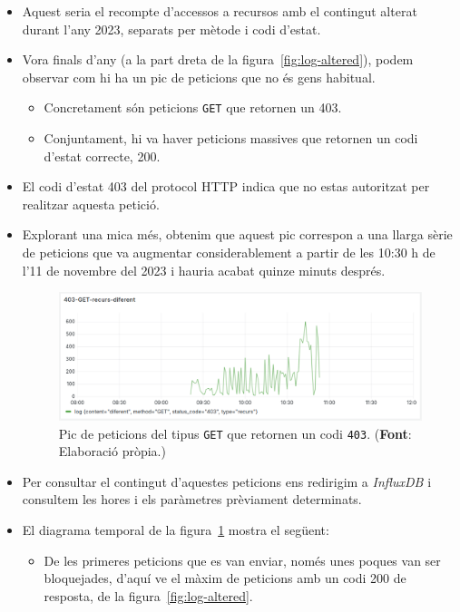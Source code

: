 \begin{itemize}
    \item Aquest seria el recompte d'accessos a recursos amb el contingut alterat durant l'any 2023, separats per mètode i codi d'estat.
    \item Vora finals d'any (a la part dreta de la figura~\ref{fig:log-altered}), podem observar com hi ha un pic de peticions que no és gens habitual.
    \begin{itemize}
        \item Concretament són peticions \texttt{GET} que retornen un 403.
        \item Conjuntament, hi va haver peticions massives que retornen un codi d'estat correcte, 200.
    \end{itemize}
    \item El codi d'estat 403 del protocol \gls{HTTP} indica que no estas autoritzat per realitzar aquesta petició.
    \item Explorant una mica més, obtenim que aquest pic correspon a una llarga sèrie de peticions que va augmentar considerablement a partir de les 10:30 h de l'11 de novembre del 2023 i hauria acabat quinze minuts després.
    \clearpage
    \begin{figure}[htbp]
        \centerline{\includegraphics[width=\textwidth]{figures/possible-attacks-403}}
        \captionsetup{justification=centering}
        \caption[Pic de peticions del tipus \texttt{GET} que retornen un codi \texttt{403}.]{Pic de peticions del tipus \texttt{GET} que retornen un codi \texttt{403}. (\textbf{Font}: Elaboració pròpia.)}\label{fig:possible-attacks}
    \end{figure}
    \item Per consultar el contingut d'aquestes peticions ens redirigim a \textit{InfluxDB} i consultem les hores i els paràmetres prèviament determinats.
    \item El diagrama temporal de la figura~\ref{fig:possible-attacks} mostra el següent:
    \begin{itemize}
        \item De les primeres peticions que es van enviar, només unes poques van ser bloquejades, d'aquí ve el màxim de peticions amb un codi 200 de resposta, de la figura~\ref{fig:log-altered}.

\end{itemize}
\end{itemize}

